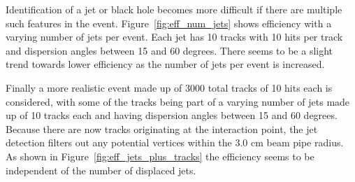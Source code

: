 \documentclass{JINST}
\begin{document}
Identification of a jet or black hole becomes more difficult if there are multiple such features in the event.  Figure~\ref{fig:eff_num_jets} shows efficiency with a varying number of jets per event.  Each jet has 10 tracks with 10 hits per track and dispersion angles between 15 and 60 degrees.  There seems to be a slight trend towards lower efficiency as the number of jets per event is increased.

Finally a more realistic event made up of 3000 total tracks of 10 hits each is considered, with some of the tracks being part of a varying number of jets made up of 10 tracks each and having dispersion angles between 15 and 60 degrees.  Because there are now tracks originating at the interaction point, the jet detection filters out any potential vertices within the 3.0 cm beam pipe radius.  As shown in Figure~\ref{fig:eff_jets_plus_tracks} the efficiency seems to be independent of the number of displaced jets.
%
\end{document}
